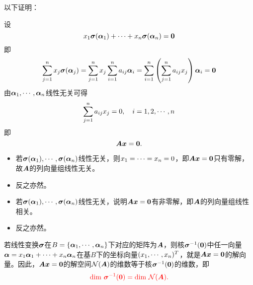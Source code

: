 \begin{frame}
  以下证明： \vspace{.1in}\pause

  设
  $$
  x_1\sigmabd(\alphabd_1)+\cd+x_n\sigmabd(\alphabd_n)=\M0
  $$
  即
  $$
  \sum_{j=1}^n x_j\sigmabd(\alphabd_j)=\sum_{j=1}^n x_j\sum_{i=1}^na_{ij}\alphabd_i=\sum_{i=1}^n\left(\sum_{j=1}^na_{ij}x_j\right)\alphabd_i=\M0
  $$
  由$\boldsymbol{\alpha}_1,\cdots,\boldsymbol{\alpha}_n$线性无关可得
  $$
  \sum_{j=1}^na_{ij}x_j=0, ~~~i=1,2,\cdots,n
  $$
  即
  $$
  \MA\vx=\M0.
  $$
\end{frame}


\begin{frame}
  \begin{itemize}
    \item 若$\boldsymbol{\sigma}(\boldsymbol{\alpha}_1),\cdots,\boldsymbol{\sigma}(\boldsymbol{\alpha}_n)$线性无关，则$x_1=\cdots=x_n=0$，即$\MA\vx=\M0$只有零解，故$\boldsymbol{A}$的列向量组线性无关。
    \item[] 反之亦然。 \\[0.1in]

    \item 若$\boldsymbol{\sigma}(\boldsymbol{\alpha}_1),\cdots,\boldsymbol{\sigma}(\boldsymbol{\alpha}_n)$线性无关，说明$\MA\vx=\M0$有非零解，即$\boldsymbol{A}$的列向量组线性相关。
    \item[] 反之亦然。
  \end{itemize}
\end{frame}


\begin{frame}
  若线性变换$\boldsymbol{\sigma}$在$B=\{\boldsymbol{\alpha}_1,\cdots,\boldsymbol{\alpha}_n\}$下对应的矩阵为$\boldsymbol{A}$，则核$\sigmabd^{-1}(\M0)$中任一向量$\boldsymbol{\alpha}=x_1\boldsymbol{\alpha}_1+\cdots+x_n\boldsymbol{\alpha}_n$在基$B$下的坐标向量$(x_1,\cdots,x_n)^T$，就是$\MA\vx=\M0$的解向量。因此，$\MA\vx=\M0$的解空间$\mathcal N(\boldsymbol{A})$的维数等于核$\sigmabd^{-1}(\M0)$的维数，即
  $$
  \red{\dim \sigmabd^{-1}(\M0)=\dim \mathcal N(\MA). }
  $$
\end{frame}




  
